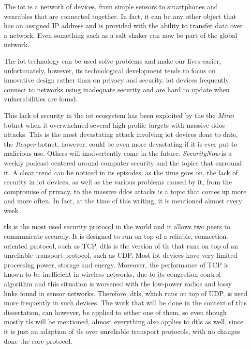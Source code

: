 \documentclass{llncs}
\begin{document}
The \gls{iot} is a network of devices, from simple sensors to smartphones and wearables
that are connected together. In fact, it can be any other object that has an assigned
IP address and is provided with the ability to transfer data over a network. Even
something such as a salt shaker\cite{SMALTThe76:online} can now be part of the global network.

The \gls{iot} technology can be used solve problems and make our lives easier,
unfortunately, however, its technological development tends to focus on
innovative design rather than on privacy and security. \gls{iot} devices frequently
connect to networks using inadequate security and are hard to update when
vulnerabilities are found.

This lack of security in the \gls{iot} ecosystem has been exploited by the
the \textit{Mirai} botnet\cite{sec17ant94:online} when it overwhelmed several high-profile
targets with massive \gls{ddos} attacks. This is the most devastating attack involving \gls{iot}
devices done to date, the \textit{Reaper} botnet\cite{ReaperCa10:online}, however, could be
even more devastating if it is ever put to malicious use. Others will inadvertently
come in the future. \textit{SecurityNow}\cite{GRCSecur72:online} is a weekly podcast
centered around computer security and the topics that surround it. A clear trend can be noticed in its episodes: as the time goes on, the lack of
security in \gls{iot} devices, as well as the various problems caused by it, from
the compromise of privacy, to the massive \gls{ddos} attacks is a topic that comes up
more and more often. In fact, at the time of this writing, it is mentioned almost every week.

\gls{tls} is the most used security protocol in the world and it allows two peers
to communicate securely. It is designed to run on top of a reliable, connection-oriented
protocol, such as TCP. \gls{dtls} is the version of \gls{tls} that runs on top
of an unreliable transport protocol, such as UDP. Most \gls{iot} devices have
very limited processing power, storage and energy. Moreover, the performance of
TCP is known to be inefficient in wireless networks, due to its congestion control
algorithm and this situation is worsened with the low-power radios and lossy
links found in sensor networks. Therefore, \gls{dtls}, which runs on top
of UDP, is used more frequently in such devices. The work that will be done in the context of this dissertation, can however,
be applied to either one of them, so even though mostly
\gls{tls} will be mentioned, almost everything also applies to \gls{dtls} as well, since it is just
an adaption of \gls{tls} over unreliable transport protocols, with no changes done
the core protocol.
\end{document}
